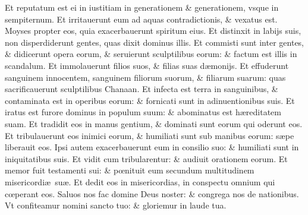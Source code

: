 \documentclass[a5paper,10pt]{book}
\def\ae{æ}
\def\oe{œ}
\begin{document}
\begin{multicols*}{2}
\newline \color{red} E\color{black}t reputatum est ei in iustitiam in generationem \& generationem, vsque in sempiternum.
\newline \color{red} E\color{black}t irritauerunt eum ad aquas contradictionis, \& vexatus est.
\newline \color{red} M\color{black}oyses propter eos, quia exacerbauerunt spiritum eius.
\newline \color{red} E\color{black}t distinxit in labijs suis, non disperdiderunt gentes, quas dixit dominus illis.
\newline \color{red} E\color{black}t commisti sunt inter gentes, \& didicerunt opera eorum, \& seruierunt sculptilibus eorum: \& factum est illis in scandalum.
\newline \color{red} E\color{black}t immolauerunt filios suos, \& filias suas d\ae monijs.
\newline \color{red} E\color{black}t effuderunt sanguinem innocentem, sanguinem filiorum suorum, \& filiarum suarum: quas sacrificauerunt sculptilibus Chanaan.
\newline \color{red} E\color{black}t infecta est terra in sanguinibus, \& contaminata est in operibus eorum: \& fornicati sunt in adinuentionibus suis.
\newline \color{red} E\color{black}t iratus est furore dominus in populum suum: \& abominatus est h\ae reditatem suam.
\newline \color{red} E\color{black}t tradidit eos in manus gentium, \& dominati sunt eorum qui oderunt eos.
\newline \color{red} E\color{black}t tribulauerunt eos inimici eorum, \& humiliati sunt sub manibus eorum: s\ae pe liberauit eos.
\newline \color{red} I\color{black}psi autem exacerbauerunt eum in consilio suo: \& humiliati sunt in iniquitatibus suis.
\newline \color{red} E\color{black}t vidit cum tribularentur: \& audiuit orationem eorum.
\newline \color{red} E\color{black}t memor fuit testamenti sui: \& p\oe nituit eum secundum multitudinem misericordi\ae \ su\ae .
\newline \color{red} E\color{black}t dedit eos in misericordias, in conspectu omnium qui c\oe perant eos.
\newline \color{red} S\color{black}aluos nos fac domine Deus noster: \& congrega nos de nationibus.
\newline \color{red} V\color{black}t confiteamur nomini sancto tuo: \& gloriemur in laude tua.

\end{multicols*}
\end{document}
